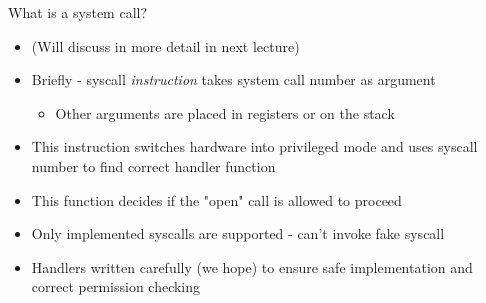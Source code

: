 \begin{frame}{What is a system call?}

	\begin{itemize}
	\item (Will discuss in more detail in next lecture)
	\item Briefly - syscall {\em instruction} takes system call number as argument
		\begin{itemize}
		\item Other arguments are placed in registers or on the stack
		\end{itemize}
	\item This instruction switches hardware into privileged mode and uses syscall number to find correct handler function
	\item This function decides if the "open" call is allowed to proceed
	\item Only implemented syscalls are supported - can't invoke fake syscall
	\item Handlers written carefully (we hope) to ensure safe implementation and correct permission checking
	\end{itemize}

\end{frame}
	
